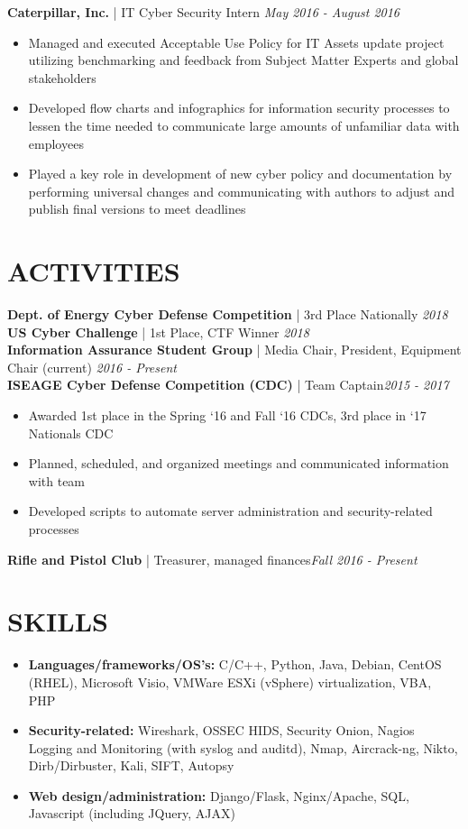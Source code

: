 \documentclass[line]{res}
\begin{document}
\begin{resume}
\textbf{Caterpillar, Inc.} | IT Cyber Security Intern \hfill \textit{May 2016 - August 2016}
\begin{itemize}
	\item Managed and executed Acceptable Use Policy for IT Assets update project utilizing benchmarking and feedback from Subject Matter Experts and global stakeholders
	\item Developed flow charts and infographics for information security processes to lessen the time needed to communicate large amounts of unfamiliar data with employees
	\item Played a key role in development of new cyber policy and documentation by performing universal changes and communicating with authors to adjust and publish final versions to meet deadlines
\end{itemize}

\section{ACTIVITIES}
\textbf{Dept. of Energy Cyber Defense Competition} | 3rd Place Nationally \hfill \textit{2018}\\
\textbf{US Cyber Challenge} | 1st Place, CTF Winner \hfill \textit{2018}\\
\textbf{Information Assurance Student Group} | Media Chair, President, Equipment Chair (current) \hfill \textit{2016 - Present}\\
\textbf{ISEAGE Cyber Defense Competition (CDC)} | Team Captain\hfill \textit{2015 - 2017}
\begin{itemize}
	\item Awarded 1st place in the Spring ‘16 and Fall ‘16 CDCs, 3rd place in ‘17 Nationals CDC
	\item Planned, scheduled, and organized meetings and communicated information with team
	\item Developed scripts to automate server administration and security-related processes
\end{itemize}
\textbf{Rifle and Pistol Club} | Treasurer, managed finances\hfill \textit{Fall 2016 - Present}\\

\section{SKILLS}
\begin{itemize}
	\item \textbf{Languages/frameworks/OS’s:} C/C++, Python, Java, Debian, CentOS (RHEL), Microsoft Visio, VMWare ESXi (vSphere) virtualization, VBA, PHP
	\item \textbf{Security-related:} Wireshark, OSSEC HIDS, Security Onion, Nagios Logging and Monitoring (with syslog and auditd), Nmap, Aircrack-ng, Nikto, Dirb/Dirbuster, Kali, SIFT, Autopsy
	\item \textbf{Web design/administration:} Django/Flask, Nginx/Apache, SQL, Javascript (including JQuery, AJAX)
\end{itemize}



\end{resume}
\end{document}
